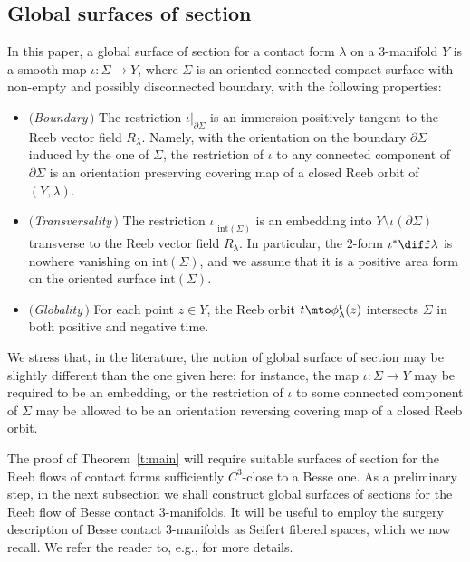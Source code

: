 \subsection{Global surfaces of section}
\label{s:sos_def}
In this paper, a global surface of section for a contact form $\lambda$ on a $3$-manifold $Y$ is a smooth map $\iota:\Sigma\to Y$, where $\Sigma$ is an oriented connected compact surface with non-empty and possibly disconnected boundary, with the following properties:
\begin{itemize}

\item \textit{$($Boundary$\,)$} The restriction $\iota|_{\partial\Sigma}$ is an immersion positively tangent to the Reeb vector field $R_{\lambda}$. Namely, with the orientation on the boundary $\partial\Sigma$ induced by the one of $\Sigma$,
the restriction of $\iota$ to any connected component of $\partial\Sigma$ is an orientation preserving covering map of a closed Reeb orbit of $(Y,\lambda)$.\vspace{2pt}

\item \textit{$($Transversality$\,)$} The restriction $\iota|_{\mathrm{int}(\Sigma)}$ is an embedding into $Y\setminus\iota(\partial\Sigma)$ transverse to the Reeb vector field $R_\lambda$.
In particular, the $2$-form $\iota^*\diff\lambda$ is nowhere vanishing on $\mathrm{int}(\Sigma)$, and we assume that it is a positive area form on the oriented surface $\mathrm{int}(\Sigma)$.\vspace{2pt}

\item \textit{$($Globality$\,)$} For each point $z\in Y$, the Reeb orbit $t\mto\phi_\lambda^t(z)$ intersects $\Sigma$ in both positive and negative time.

\end{itemize}
We stress that, in the literature, the notion of global surface of section may be slightly different than the one given here: for instance, the map $\iota:\Sigma\to Y$ may be required to be an embedding, or the restriction of $\iota$ to some connected component of $\Sigma$ may be allowed to be an orientation reversing covering map of a closed Reeb orbit.

\label{s:surgery}

The proof of Theorem~\ref{t:main} will require suitable surfaces of section for the Reeb flows of contact forms sufficiently $C^3$-close to a Besse one. As a preliminary step, in the next subsection we shall construct global surfaces of sections for the Reeb flow of Besse contact $3$-manifolds. It will be useful to employ the surgery description of Besse contact $3$-manifolds as Seifert fibered spaces, which we now recall. We refer the reader to, e.g., \cite{Orlik:1972ts,Jankins:1983zm} for more details.

